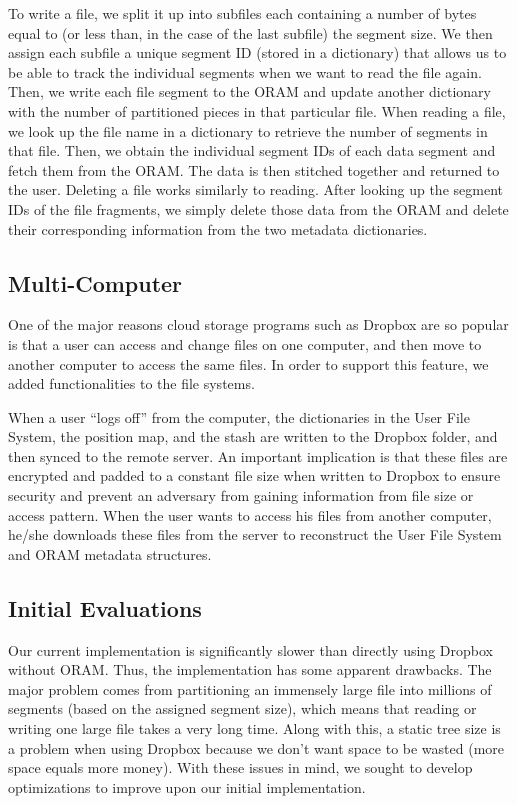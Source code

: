 \documentclass[conference]{IEEEtran}
\begin{document}
To write a file, we split it up into subfiles each containing a number of bytes equal to (or less than, in the case of the last subfile) the segment size. We then assign each subfile a unique segment ID (stored in a dictionary) that allows us to be able to track the individual segments when we want to read the file again. Then, we write each file segment to the ORAM and update another dictionary with the number of partitioned pieces in that particular file. When reading a file, we look up the file name in a dictionary to retrieve the number of segments in that file. Then, we obtain the individual segment IDs of each data segment and fetch them from the ORAM. The data is then stitched together and returned to the user. Deleting a file works similarly to reading. After looking up the segment IDs of the file fragments, we simply delete those data from the ORAM and delete their corresponding information from the two metadata dictionaries.

\subsection{Multi-Computer}

\label{sec:MultiComp}
One of the major reasons cloud storage programs such as Dropbox are so popular is that a user can access and change files on one computer, and then move to another computer to access the same files. In order to support this feature, we added functionalities to the file systems.

When a user “logs off” from the computer, the dictionaries in the User File System, the position map, and the stash are written to the Dropbox folder, and then synced to the remote server. An important implication is that these files are encrypted and padded to a constant file size when written to Dropbox to ensure security and prevent an adversary from gaining information from file size or access pattern. When the user wants to access his files from another computer, he/she downloads these files from the server to reconstruct the User File System and ORAM metadata structures.

\subsection{Initial Evaluations}

Our current implementation is significantly slower than directly using Dropbox without ORAM. Thus, the implementation has some apparent drawbacks. The major problem comes from partitioning an immensely large file into millions of segments (based on the assigned segment size), which means that reading or writing one large file takes a very long time. Along with this, a static tree size is a problem when using Dropbox because we don’t want space to be wasted (more space equals more money). With these issues in mind, we sought to develop optimizations to improve upon our initial implementation.
\end{document}
